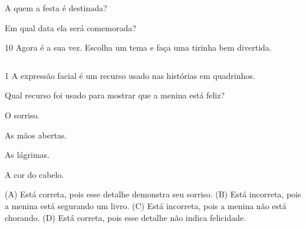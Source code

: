 \begin{escolha}
\item A quem a festa é destinada?


\item Em qual data ela será comemorada?

\end{escolha}

\num{10} Agora é a sua vez. Escolha um tema e faça uma tirinha bem divertida.

\begin{longtable}[]{@{}ll@{}}
\toprule
&\tabularnewline
\bottomrule
\end{longtable}


\num{1} A expressão facial é um recurso usado nas histórias em quadrinhos.


Qual recurso foi usado para mostrar que a menina está feliz?

\begin{minipage}{.5\textwidth}
\begin{escolha}
\item O sorriso.

\item As mãos abertas.

\item As lágrimas.

\item A cor do cabelo.
\end{escolha}
\end{minipage}

(A) Está correta, pois esse detalhe demonstra seu sorriso.
(B) Está incorreta, pois a menina está segurando um livro.
(C) Está incorreta, pois a menina não está chorando.
(D) Está correta, pois esse detalhe não indica felicidade.

